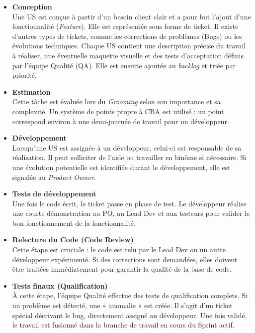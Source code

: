 \documentclass{article}
\begin{document}
\begin{itemize}
    \item \textbf{Conception} \\
    Une US est conçue à partir d'un besoin client clair et a pour but l'ajout d'une fonctionnalité (\textit{Feature}). Elle est représentée sous forme de ticket. Il existe d'autres types de tickets, comme les corrections de problèmes (Bugs) ou les évolutions techniques. Chaque US contient une description précise du travail à réaliser, une éventuelle maquette visuelle et des tests d'acceptation définis par l'équipe Qualité (QA). Elle est ensuite ajoutée au \textit{backlog} et triée par priorité.

    \item \textbf{Estimation} \\
    Cette tâche est évaluée lors du \textit{Grooming} selon son importance et sa complexité. Un système de points propre à CBA est utilisé : un point correspond environ à une demi-journée de travail pour un développeur.

    \item \textbf{Développement} \\
    Lorsqu'une US est assignée à un développeur, celui-ci est responsable de sa réalisation. Il peut solliciter de l'aide ou travailler en binôme si nécessaire. Si une évolution potentielle est identifiée durant le développement, elle est signalée au \textit{Product Owner}.

    \item \textbf{Tests de développement} \\
    Une fois le code écrit, le ticket passe en phase de test. Le développeur réalise une courte démonstration au PO, au Lead Dev et aux testeurs pour valider le bon fonctionnement de la fonctionnalité.

    \item \textbf{Relecture du Code (Code Review)} \\
    Cette étape est cruciale : le code est relu par le Lead Dev ou un autre développeur expérimenté. Si des corrections sont demandées, elles doivent être traitées immédiatement pour garantir la qualité de la base de code.

    \newpage

    \item \textbf{Tests finaux (Qualification)} \\
    À cette étape, l'équipe Qualité effectue des tests de qualification complets. Si un problème est détecté, une « anomalie » est créée. Il s'agit d'un ticket spécial décrivant le bug, directement assigné au développeur. Une fois validé, le travail est fusionné dans la branche de travail en cours du Sprint actif.
\end{itemize}
\end{document}

